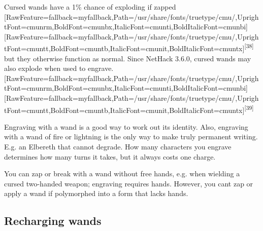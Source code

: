 Cursed wands have a 1\% chance of exploding if zapped \allowbreak{}\setmainfont{cmunrm.ttf}[RawFeature={fallback=myfallback},Path=/usr/share/fonts/truetype/cmu/,UprightFont=cmunrm,BoldFont=cmunbx,ItalicFont=cmunti,BoldItalicFont=cmunbi]\setmonofont{cmunrm.ttf}[RawFeature={fallback=myfallback},Path=/usr/share/fonts/truetype/cmu/,UprightFont=cmuntt,BoldFont=cmuntb,ItalicFont=cmunit,BoldItalicFont=cmuntx]\textsuperscript{{$\text{[}$}38{$\text{]}$}} but they otherwise function as normal. Since NetHack 3.6.0\footnotemark[122], cursed wands may also explode when used to engrave.\allowbreak{}\setmainfont{cmunrm.ttf}[RawFeature={fallback=myfallback},Path=/usr/share/fonts/truetype/cmu/,UprightFont=cmunrm,BoldFont=cmunbx,ItalicFont=cmunti,BoldItalicFont=cmunbi]\setmonofont{cmunrm.ttf}[RawFeature={fallback=myfallback},Path=/usr/share/fonts/truetype/cmu/,UprightFont=cmuntt,BoldFont=cmuntb,ItalicFont=cmunit,BoldItalicFont=cmuntx]\textsuperscript{{$\text{[}$}39{$\text{]}$}}


Engraving\footnotemark[123] with a wand is a good way to work out its identity\footnotemark[124]. Also, engraving with a wand of fire\footnotemark[125] or lightning\footnotemark[126] is the only way to make truly permanent writing. E.g. an Elbereth\footnotemark[127] that cannot degrade. How many characters you engrave determines how many turns it takes, but it always costs one charge.


You can zap or break with a wand without free hands\footnotemark[128], e.g. when wielding a cursed two-{}handed weapon; engraving requires hands\footnotemark[129]. However, you can\textquotesingle{}t zap or apply a wand if polymorphed into a form that lacks hands.



\subsection{Recharging wands}
\label{9}

